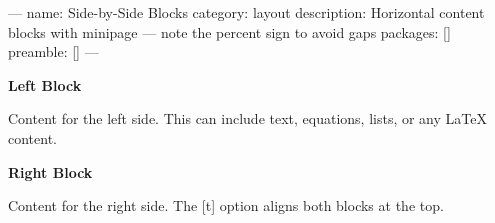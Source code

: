 ---
name: Side-by-Side Blocks
category: layout
description: Horizontal content blocks with minipage — note the percent sign to avoid gaps
packages: []
preamble: []
---
\begin{minipage}[t]{0.48\textwidth}
  \textbf{Left Block}

  Content for the left side. This can include text, equations, lists, or any LaTeX content.
\end{minipage}%
\hfill%
\begin{minipage}[t]{0.48\textwidth}
  \textbf{Right Block}

  Content for the right side. The [t] option aligns both blocks at the top.
\end{minipage}
